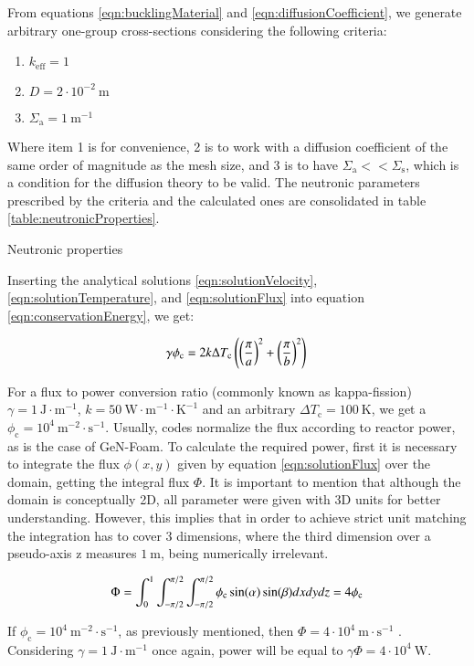From equations \ref{eqn:bucklingMaterial} and \ref{eqn:diffusionCoefficient}, we generate arbitrary one-group cross-sections considering the following criteria:

\begin{enumerate}
    \item $ k_{\text{eff}} = 1 $
    \item $ D = 2 \cdot 10^{-2} \ \text{m} $
    \item $ \Sigma_{\text{a}} = 1 \ \text{m}^{-1} $
\end{enumerate}

Where item 1 is for convenience, 2 is to work with a diffusion coefficient of the same order of magnitude as the mesh size, and 3 is to have $ \Sigma_{\text{a}} << \Sigma_{\text{s}} $, which is a condition for the diffusion theory to be valid.
The neutronic parameters prescribed by the criteria and the calculated ones are consolidated in table \ref{table:neutronicProperties}.

\begin{table}[htbp]
    \caption{Neutronic properties}
    \centering
    
    \label{table:neutronicProperties}
\end{table}

Inserting the analytical solutions \ref{eqn:solutionVelocity}, \ref{eqn:solutionTemperature}, and \ref{eqn:solutionFlux} into equation \ref{eqn:conservationEnergy}, we get:

\begin{equation}
    \deltaT
\end{equation}

For a flux to power conversion ratio (commonly known as kappa-fission) $ \gamma = 1 \ \text{J}\cdot \text{m}^{-1} $, $ k = 50 \ \text{W} \cdot \text{m}^{-1} \cdot \text{K}^{-1} $ and an arbitrary $ \Delta T_{\text{c}} = 100 \ \text{K} $, we get a $ \phi_{\text{c}} = 10^{4} \ \text{m}^{-2} \cdot \text{s}^{-1} $.
Usually, codes normalize the flux according to reactor power, as is the case of GeN-Foam.
To calculate the required power, first it is necessary to integrate the flux $ \phi(x,y) $ given by equation \ref{eqn:solutionFlux} over the domain, getting the integral flux $ \Phi $.
It is important to mention that although the domain is conceptually 2D, all parameter were given with 3D units for better understanding.
However, this implies that in order to achieve strict unit matching the integration has to cover 3 dimensions, where the third dimension over a pseudo-axis z measures $ 1 \ \text {m} $, being numerically irrelevant.

\begin{equation}
    \integralFlux
\end{equation}

If $ \phi_{\text{c}} = 10^{4} \ \text{m}^{-2} \cdot \text{s}^{-1} $, as previously mentioned, then $ \Phi = 4 \cdot 10^{4} \ \text{m} \cdot \text{s}^{-1} $ .
Considering $ \gamma = 1 \ \text{J}\cdot \text{m}^{-1} $ once again, power will be equal to $ \gamma \Phi = 4 \cdot 10^{4} \ \text{W} $.
